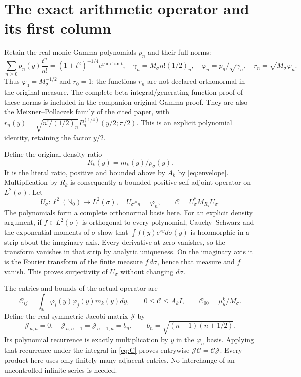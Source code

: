 \documentclass[11pt]{article}
\newcommand{\R}{\mathbb R}
\newcommand{\N}{\mathbb N}
\begin{document}
\section{The exact arithmetic operator and its first column}
Retain the real monic Gamma polynomials $p_n$ and their full norms:
\[
 \sum_{n\ge0}p_n(y)\frac{t^n}{n!}
 =(1+t^2)^{-1/4}e^{y\arctan t},\quad
 \gamma_n=M_\sigma n!(1/2)_n,\quad
 \varphi_n=p_n/\sqrt{\gamma_n},\quad
 r_n=\sqrt{M_\sigma}\varphi_n.
\]
Thus $\varphi_0=M_\sigma^{-1/2}$ and $r_0=1$; the functions
$r_n$ are not declared orthonormal in the original measure.
The complete beta-integral/generating-function proof of these norms
is included in the companion original-Gamma proof. They are also
the Meixner--Pollaczek family of the cited paper, with
$r_n(y)=\sqrt{n!/(1/2)_n}P_n^{(1/4)}(y/2;\pi/2)$.
This is an explicit polynomial identity, retaining the factor $y/2$.

Define the original density ratio
\[
 R_k(y)=m_k(y)/\rho_\sigma(y).
\]
It is the literal ratio, positive and bounded above by $A_k$ by
\eqref{eq:envelope}. Multiplication by $R_k$ is consequently a bounded
positive self-adjoint operator on $L^2(\sigma)$. Let
\[
 U_\sigma:\ell^2(\N_0)\longrightarrow L^2(\sigma),\quad
 U_\sigma e_n=\varphi_n,
 \qquad \mathcal C=U_\sigma^*M_{R_k}U_\sigma.
\]
The polynomials form a complete orthonormal basis here. For an explicit
density argument, if $f\in L^2(\sigma)$ is orthogonal to every
polynomial, Cauchy--Schwarz and the exponential moments of $\sigma$
show that $\int f(y)e^{zy}d\sigma(y)$ is holomorphic in a strip
about the imaginary axis. Every derivative at zero vanishes, so the
transform vanishes in that strip by analytic uniqueness. On the
imaginary axis it is the Fourier transform of the finite measure
$f\,d\sigma$, hence that measure and $f$ vanish. This proves
surjectivity of $U_\sigma$ without changing $d\sigma$.

The entries and bounds of the actual operator are
\begin{equation}\label{eq:C}
 \mathcal C_{ij}=\int_\R\varphi_i(y)\varphi_j(y)m_k(y)dy,
 \qquad 0\le\mathcal C\le A_k I,
 \qquad \mathcal C_{00}=\mu_h^k/M_\sigma.
\end{equation}
Define the real symmetric Jacobi matrix $\mathcal J$ by
\[
 \mathcal J_{n,n}=0,\quad
 \mathcal J_{n,n+1}=\mathcal J_{n+1,n}=b_n,
 \qquad b_n=\sqrt{(n+1)(n+1/2)}.
\]
Its polynomial recurrence is exactly multiplication by $y$ in the
$\varphi_n$ basis. Applying that recurrence under the integral in
\eqref{eq:C} proves entrywise $\mathcal J\mathcal C=\mathcal C\mathcal J$.
Every product here uses only finitely many adjacent entries. No
interchange of an uncontrolled infinite series is needed.
\end{document}
